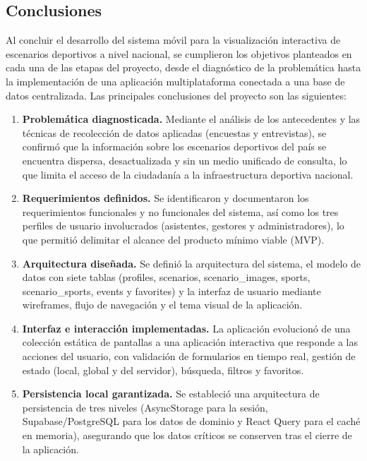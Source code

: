 
\subsection*{Conclusiones}

Al concluir el desarrollo del sistema m\'ovil \nombreApp{} para la
visualizaci\'on interactiva de escenarios deportivos a nivel nacional, se
cumplieron los objetivos planteados en cada una de las etapas del proyecto,
desde el diagn\'ostico de la problem\'atica hasta la implementaci\'on de una
aplicaci\'on multiplataforma conectada a una base de datos centralizada. Las
principales conclusiones del proyecto son las siguientes:

\begin{enumerate}
  \item \textbf{Problem\'atica diagnosticada.} Mediante el an\'alisis de los
    antecedentes y las t\'ecnicas de recolecci\'on de datos aplicadas (encuestas
    y entrevistas), se confirm\'o que la informaci\'on sobre los escenarios
    deportivos del pa\'is se encuentra dispersa, desactualizada y sin un medio
    unificado de consulta, lo que limita el acceso de la ciudadan\'ia a la
    infraestructura deportiva nacional.

  \item \textbf{Requerimientos definidos.} Se identificaron y documentaron los
    requerimientos funcionales y no funcionales del sistema, as\'i como los tres
    perfiles de usuario involucrados (asistentes, gestores y administradores),
    lo que permiti\'o delimitar el alcance del producto m\'inimo viable (MVP).

  \item \textbf{Arquitectura dise\~nada.} Se defini\'o la arquitectura del
    sistema, el modelo de datos con siete tablas (profiles, scenarios,
    scenario\_images, sports, scenario\_sports, events y favorites) y la interfaz
    de usuario mediante wireframes, flujo de navegaci\'on y el tema visual de la
    aplicaci\'on.

  \item \textbf{Interfaz e interacci\'on implementadas.} La aplicaci\'on
    evolucion\'o de una colecci\'on est\'atica de pantallas a una aplicaci\'on
    interactiva que responde a las acciones del usuario, con validaci\'on de
    formularios en tiempo real, gesti\'on de estado (local, global y del
    servidor), b\'usqueda, filtros y favoritos.

  \item \textbf{Persistencia local garantizada.} Se estableci\'o una
    arquitectura de persistencia de tres niveles (AsyncStorage para la
    sesi\'on, Supabase/PostgreSQL para los datos de dominio y React Query para
    el cach\'e en memoria), asegurando que los datos cr\'iticos se conserven
    tras el cierre de la aplicaci\'on.


\end{enumerate}
